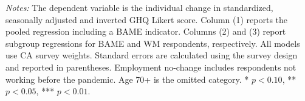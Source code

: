 \begin{landscape}
\vspace{-0.8em}
\noindent\parbox{0.95\linewidth}{\footnotesize \textit{Notes:} The dependent variable is the individual change in standardized, seasonally adjusted and inverted GHQ Likert score. Column (1) reports the pooled regression including a BAME indicator. Columns (2) and (3) report subgroup regressions for BAME and WM respondents, respectively. All models use CA survey weights. Standard errors are calculated using the survey design and reported in parentheses. Employment no-change includes respondents not working before the pandemic. Age 70+ is the omitted category. * \(p<0.10\), ** \(p<0.05\), *** \(p<0.01\).}
\end{landscape}